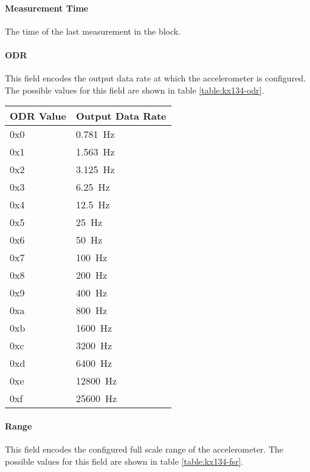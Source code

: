 \paragraph{Measurement Time}
The time of the last measurement in the block.

\paragraph{ODR}
This field encodes the output data rate at which the accelerometer is configured. The possible values for this field
are shown in table \ref{table:kx134-odr}.

\begin{table*}[htb]
    \centering
    \begin{tabular}{@{}ll@{}}
        \toprule
        ODR Value & Output Data Rate     \\
        \midrule
        0x0       & {\SI{0.781}{\hertz}} \\
        0x1       & {\SI{1.563}{\hertz}} \\
        0x2       & {\SI{3.125}{\hertz}} \\
        0x3       & {\SI{6.25}{\hertz}}  \\
        0x4       & {\SI{12.5}{\hertz}}  \\
        0x5       & {\SI{25}{\hertz}}    \\
        0x6       & {\SI{50}{\hertz}}    \\
        0x7       & {\SI{100}{\hertz}}   \\
        0x8       & {\SI{200}{\hertz}}   \\
        0x9       & {\SI{400}{\hertz}}   \\
        0xa       & {\SI{800}{\hertz}}   \\
        0xb       & {\SI{1600}{\hertz}}  \\
        0xc       & {\SI{3200}{\hertz}}  \\
        0xd       & {\SI{6400}{\hertz}}  \\
        0xe       & {\SI{12800}{\hertz}} \\
        0xf       & {\SI{25600}{\hertz}} \\
        \bottomrule
    \end{tabular}
    \caption{KX134-1211 Output Data Rate Values}
    \label{table:kx134-odr}
\end{table*}

\paragraph{Range}
This field encodes the configured full scale range of the accelerometer. The possible values for this field are shown
in table \ref{table:kx134-fsr}.

